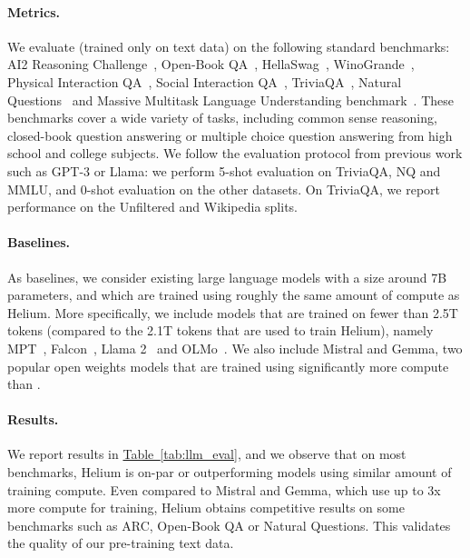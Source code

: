 \paragraph{Metrics.}
We evaluate \helium (trained only on text data) on the following standard benchmarks: AI2 Reasoning Challenge~\citep[ARC]{clark2018think}, Open-Book QA~\citep[OBQA]{mihaylov2018can}, HellaSwag~\citep[HS]{zellers2019hellaswag}, WinoGrande~\citep[WG]{sakaguchi2021winogrande}, Physical Interaction QA~\citep[PIQA]{bisk2020piqa}, Social Interaction QA~\citep{sap2019socialiqa}, TriviaQA~\citep[TQA]{joshi2017triviaqa}, Natural Questions~\citep[NQ]{kwiatkowski2019natural} and Massive Multitask Language Understanding benchmark~\citep[MMLU]{hendrycks2020measuring}.
These benchmarks cover a wide variety of tasks, including common sense reasoning, closed-book question answering or multiple choice question answering from high school and college subjects.
We follow the evaluation protocol from previous work such as GPT-3 or Llama: we perform 5-shot evaluation on TriviaQA, NQ and MMLU, and 0-shot evaluation on the other datasets.
On TriviaQA, we report performance on the Unfiltered and Wikipedia splits.

\paragraph{Baselines.}
As baselines, we consider existing large language models with a size around 7B parameters, and which are trained using roughly the same amount of compute as Helium.
More specifically, we include models that are trained on fewer than 2.5T tokens (compared to the 2.1T tokens that are used to train Helium), namely MPT~\citep{MosaicML2023Introducing}, Falcon~\citep{almazrouei2023falcon}, Llama 2~\citep{touvron2023llama} and OLMo~\citep{Groeneveld2023OLMo}.
We also include Mistral and Gemma, two popular open weights models that are trained using significantly more compute than \helium.

\paragraph{Results.}
We report results in \hyperref[tab:llm_eval]{Table~\ref{tab:llm_eval}}, and we observe that on most benchmarks, Helium is on-par or outperforming models using similar amount of training compute.
Even compared to Mistral and Gemma, which use up to 3x more compute for training, Helium obtains competitive results on some benchmarks such as ARC, Open-Book QA or Natural Questions.
This validates the quality of our pre-training text data.

